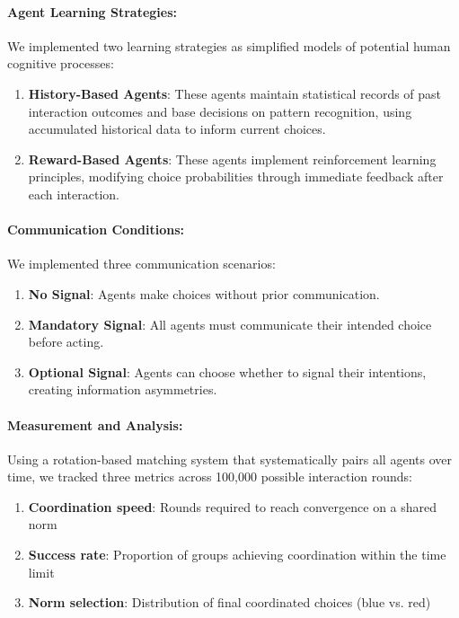 \documentclass[12pt,a4paper]{article}
\begin{document}
\paragraph{Agent Learning Strategies:} We implemented two learning strategies as simplified models of potential human cognitive processes:

\begin{enumerate}
    \item \textbf{History-Based Agents}: These agents maintain statistical records of past interaction outcomes and base decisions on pattern recognition, using accumulated historical data to inform current choices. 
    
    \item \textbf{Reward-Based Agents}: These agents implement reinforcement learning principles, modifying choice probabilities through immediate feedback after each interaction.
\end{enumerate}

\paragraph{Communication Conditions:} We implemented three communication scenarios:
\begin{enumerate}
    \item \textbf{No Signal}: Agents make choices without prior communication.
    
    \item \textbf{Mandatory Signal}: All agents must communicate their intended choice before acting.
    
    \item \textbf{Optional Signal}: Agents can choose whether to signal their intentions, creating information asymmetries.
\end{enumerate}

\paragraph{Measurement and Analysis:} Using a rotation-based matching system that systematically pairs all agents over time, we tracked three metrics across 100,000 possible interaction rounds:
\begin{enumerate}
    \item \textbf{Coordination speed}: Rounds required to reach convergence on a shared norm
    \item \textbf{Success rate}: Proportion of groups achieving coordination within the time limit
    \item \textbf{Norm selection}: Distribution of final coordinated choices (blue vs. red)
\end{enumerate}
\end{document}
